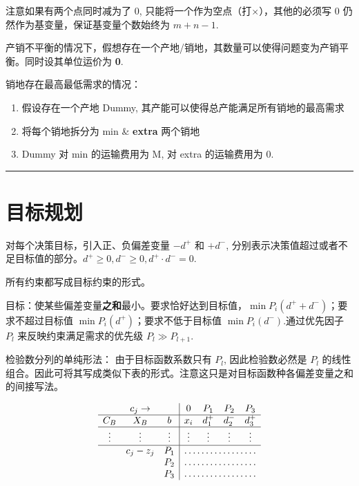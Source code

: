 \documentclass[UTF8, 6pt]{ctexart}
\newcommand{\mcompress}{\vspace{-10 px}}
\newcommand{\sectionline}{\rule[2pt]{0.45\textwidth}{0.05em}}
\begin{document}
注意如果有两个点同时减为了 0, 只能将一个作为空点（打$\times$），其他的必须写 0 仍然作为基变量，保证基变量个数始终为 $m+n-1$.

产销不平衡的情况下，假想存在一个产地/销地，其数量可以使得问题变为产销平衡。同时设其单位运价为 \textbf{0}. 

销地存在最高最低需求的情况：
\begin{enumerate}
\item 假设存在一个产地 Dummy, 其产能可以使得总产能满足所有销地的最高需求
\item 将每个销地拆分为 min \& \textbf{extra} 两个销地
\item Dummy 对 min 的运输费用为 M, 对 extra 的运输费用为 0.
\end{enumerate}

\sectionline

\mcompress
\mcompress

\section{目标规划}

对每个决策目标，引入正、负偏差变量 $-d^+$ 和 $+d^-$, 分别表示决策值超过或者不足目标值的部分。$d^+ \geq 0, d^- \geq 0, d^+ \cdot d^- = 0$.

所有约束都写成目标约束的形式。

目标：使某些偏差变量\textbf{之和}最小。要求恰好达到目标值，$\min P_i(d^+ + d^-) $；要求不超过目标值 $\min P_i(d^+) $；要求不低于目标值 $\min P_i(d^-) $.通过优先因子 $P_l$ 来反映约束满足需求的优先级 $P_l \gg P_{l+1}$. 

检验数分列的单纯形法：
由于目标函数系数只有 $P_l$, 因此检验数必然是 $P_l$ 的线性组合。因此可将其写成类似下表的形式。注意这只是对目标函数种各偏差变量之和的间接写法。

\mcompress
\[
\begin{array}{ccc|cccc}
	       & c_j \rightarrow &        &      0       &  P_1   &  P_2   &  P_3   \\ \hline
	 C_B   &       X_B       &   b    &     x_i      & d_1^+  & d_2^-  & d_3^+  \\ \hline
	\vdots &     \vdots      & \vdots &    \vdots    & \vdots & \vdots & \vdots \\ \hline
	       &    c_j - z_j    &  P_1   & \hdotsfor{4}  \\
	       &                 &  P_2   & \hdotsfor{4}  \\
	       &                 &  P_3   & \hdotsfor{4} 
\end{array}
\]
\mcompress
\end{document}
